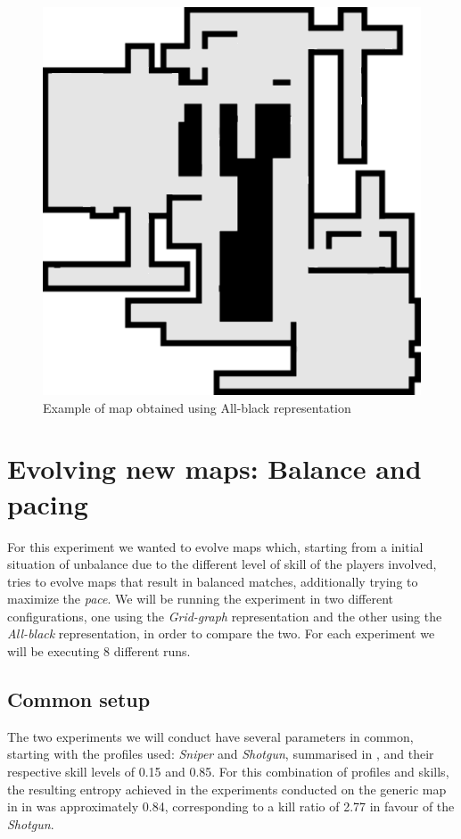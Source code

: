 \begin{figure}
\centering
\includegraphics[scale=0.4]{Images/images/random-arnaboldi-map.png}  
\caption{Example of map obtained using All-black representation}
\label{fig:complex_AB_map}
\end{figure}

\section{Evolving new maps: Balance and pacing}
For this experiment we wanted to evolve maps which, starting from a initial situation of unbalance due to the different level of skill of the players involved, tries to evolve maps that result in balanced matches, additionally trying to maximize the \textit{pace}.
We will be running the experiment in two different configurations, one using the \textit{Grid-graph} representation and the other using the \textit{All-black} representation, in order to compare the two. For each experiment we will be executing 8 different runs.

\subsection{Common setup}

The two experiments we will conduct have several parameters in common, starting with the profiles used: \textit{Sniper} and \textit{Shotgun}, summarised in , and their respective skill levels of 0.15 and 0.85. For this combination of profiles and skills, the resulting entropy achieved in the experiments conducted on the generic map in in  was approximately 0.84, corresponding to a kill ratio of 2.77 in favour of the \textit{Shotgun}.

